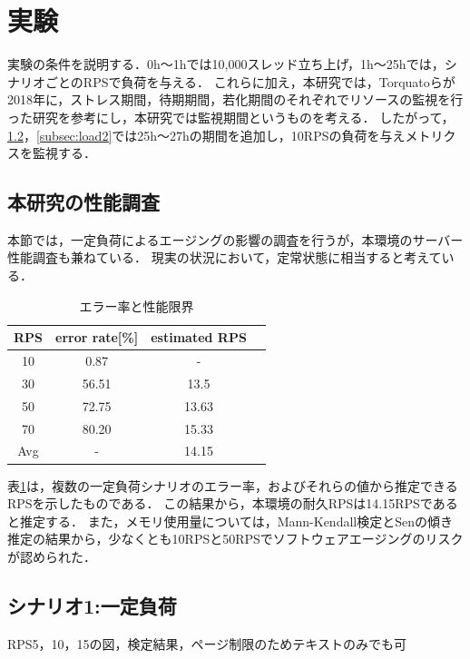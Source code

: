 \documentclass[twoside,twocolumn,10pt]{jarticle}  %
\begin{document}
\section{実験}
実験の条件を説明する．0h～1hでは10,000スレッド立ち上げ，1h～25hでは，シナリオごとのRPSで負荷を与える．
これらに加え，本研究では，Torquatoらが2018年に，ストレス期間，待期期間，若化期間のそれぞれでリソースの監視を行った研究を参考にし，本研究では監視期間というものを考える．
したがって，\ref{subsec:load1}，\ref{subsec:load2}では25h～27hの期間を追加し，10RPSの負荷を与えメトリクスを監視する．
\subsection{本研究の性能調査}\label{subsec:limit}
本節では，一定負荷によるエージングの影響の調査を行うが，本環境のサーバー性能調査も兼ねている．
現実の状況において，定常状態に相当すると考えている．

\begin{table}[h]
  \centering
  \caption{エラー率と性能限界}
  \label{tab:rps}
  \begin{tabular}{cccc}
      \hline \hline
      RPS & error rate[\%] & estimated RPS \\ \hline
      10 & 0.87 & - \\ \hline
      30 & 56.51 & 13.5 \\ \hline
      50 & 72.75 & 13.63 \\ \hline
      70 & 80.20 & 15.33 \\ \hline \hline
      Avg & - & 14.15 \\ \hline
  \end{tabular}
\end{table}

表\ref{tab:rps}は，複数の一定負荷シナリオのエラー率，およびそれらの値から推定できるRPSを示したものである．
この結果から，本環境の耐久RPSは14.15RPSであると推定する．
また，メモリ使用量については，Mann-Kendall検定とSenの傾き推定の結果から，少なくとも10RPSと50RPSでソフトウェアエージングのリスクが認められた．\par

\subsection{シナリオ1:一定負荷}\label{subsec:load1}
RPS5，10，15の図，検定結果，ページ制限のためテキストのみでも可
\end{document}
